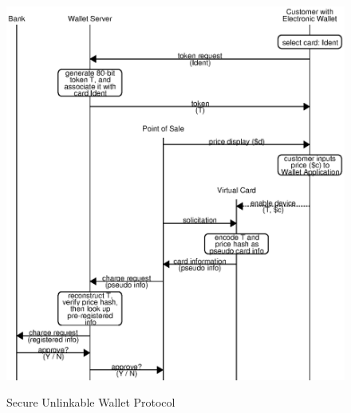 \begin{figure}[h!]
  \caption{Secure Unlinkable Wallet Protocol}
  \centering
    \includegraphics{img/unlinkable-2.eps}
  \label{fig:unlinkable-2}
\end{figure}

